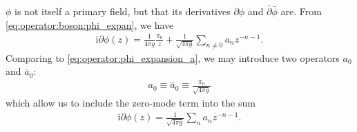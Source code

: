 \documentclass[10pt]{article}
\newcommand{\ii}{\mathrm{i}}
\begin{document}
$\phi$ is not itself a primary field, but that its derivatives $\partial\phi$ and $\bar{\partial}\bar{\phi}$ are.
From \cref{eq:operator:boson:phi_expan}, we have
\begin{align}
    \ii\partial\phi(z)=\frac{1}{4\pi g}\frac{\pi_0}{z}+\frac{1}{\sqrt{4\pi g}}\sum_{n\neq0}a_n z^{-n-1}.
\end{align}
Comparing to \cref{eq:operator:phi_expansion_a}, we may introduce two operators $a_0$ and $\bar{a}_0$:
\begin{align}
    a_0\equiv\bar{a}_0\equiv\frac{\pi_0}{\sqrt{4\pi g}}
\end{align}
which allow us to include the zero-mode term into the sum
\begin{align}
    \ii\partial\phi(z)=\frac{1}{\sqrt{4\pi g}}\sum_{n}a_n z^{-n-1}.
\end{align}
\end{document}
